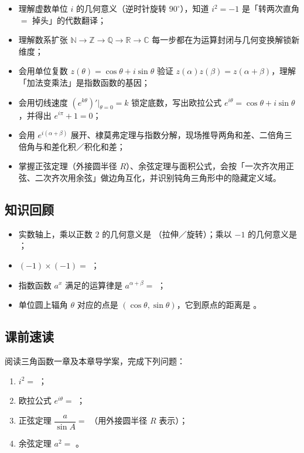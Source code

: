 \begin{learnobjective}
\begin{itemize}
  \item 理解虚数单位 $i$ 的几何意义（逆时针旋转 $90^\circ$），知道 $i^2=-1$ 是「转两次直角 $=$ 掉头」的代数翻译；
  \item 理解数系扩张 $\mathbb{N}\to\mathbb{Z}\to\mathbb{Q}\to\mathbb{R}\to\mathbb{C}$ 每一步都在为运算封闭与几何变换解锁新维度；
  \item 会用单位复数 $z(\theta)=\cos\theta+i\sin\theta$ 验证 $z(\alpha)z(\beta)=z(\alpha+\beta)$，理解「加法变乘法」是指数函数的基因；
  \item 会用切线速度 $(e^{k\theta})'\big|_{\theta=0}=k$ 锁定底数，写出欧拉公式 $e^{i\theta}=\cos\theta+i\sin\theta$，并得出 $e^{i\pi}+1=0$；
  \item 会用 $e^{i(\alpha+\beta)}$ 展开、棣莫弗定理与指数分解，现场推导两角和差、二倍角三倍角与和差化积／积化和差；
  \item 掌握正弦定理（外接圆半径 $R$）、余弦定理与面积公式，会按「一次齐次用正弦、二次齐次用余弦」做边角互化，并识别钝角三角形中的隐藏定义域。
\end{itemize}
\end{learnobjective}

\begin{preview}
\subsection*{知识回顾}
\begin{itemize}
  \item 实数轴上，乘以正数 $2$ 的几何意义是 \blank（拉伸／旋转）；乘以 $-1$ 的几何意义是 \blank；
  \item $(-1)\times(-1)=$ \blank；
  \item 指数函数 $a^x$ 满足的运算律是 $a^{\alpha+\beta}=$ \blank；
  \item 单位圆上辐角 $\theta$ 对应的点是 $(\cos\theta,\sin\theta)$，它到原点的距离是 \blank。
\end{itemize}

\subsection*{课前速读}
阅读三角函数一章及本章导学案，完成下列问题：
\begin{enumerate}
  \item $i^2=$ \blank；
  \item 欧拉公式 $e^{i\theta}=$ \blank；
  \item 正弦定理 $\dfrac{a}{\sin A}=$ \blank（用外接圆半径 $R$ 表示）；
  \item 余弦定理 $a^2=$ \blank。
\end{enumerate}
\end{preview}


